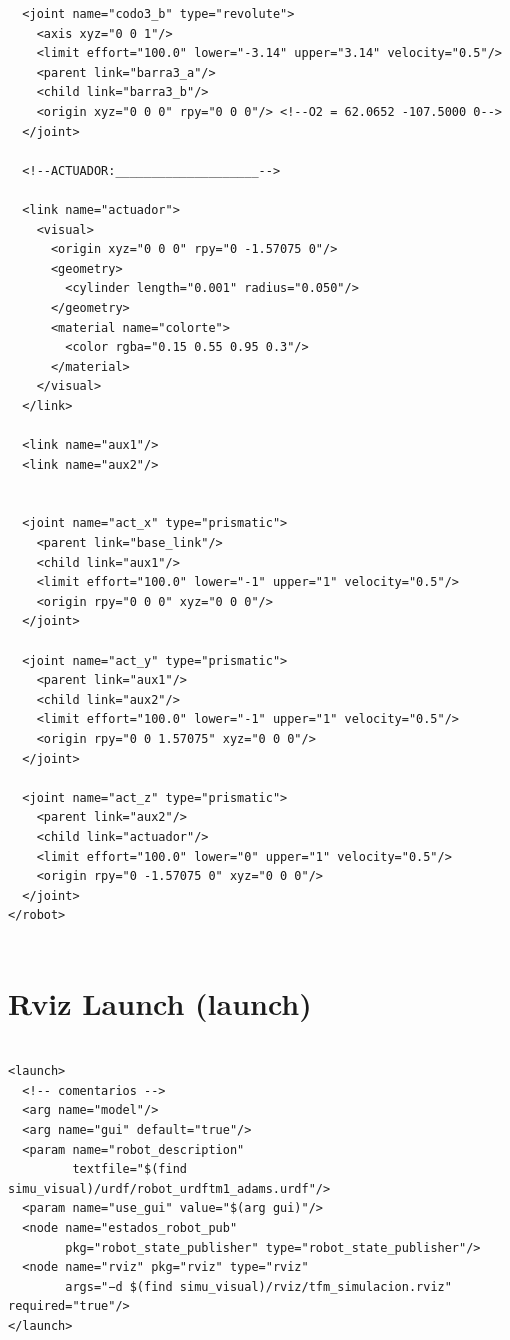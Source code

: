 \begin{lstlisting}
  <joint name="codo3_b" type="revolute">
    <axis xyz="0 0 1"/>
    <limit effort="100.0" lower="-3.14" upper="3.14" velocity="0.5"/>
    <parent link="barra3_a"/>
    <child link="barra3_b"/>
    <origin xyz="0 0 0" rpy="0 0 0"/> <!--O2 = 62.0652 -107.5000 0-->
  </joint>

  <!--ACTUADOR:____________________-->

  <link name="actuador">
    <visual>
      <origin xyz="0 0 0" rpy="0 -1.57075 0"/>
      <geometry>
        <cylinder length="0.001" radius="0.050"/>
      </geometry>
      <material name="colorte">
        <color rgba="0.15 0.55 0.95 0.3"/>
      </material>
    </visual>
  </link>

  <link name="aux1"/>
  <link name="aux2"/>


  <joint name="act_x" type="prismatic">
    <parent link="base_link"/>
    <child link="aux1"/>
    <limit effort="100.0" lower="-1" upper="1" velocity="0.5"/>
    <origin rpy="0 0 0" xyz="0 0 0"/>
  </joint>

  <joint name="act_y" type="prismatic">
    <parent link="aux1"/>
    <child link="aux2"/>
    <limit effort="100.0" lower="-1" upper="1" velocity="0.5"/>
    <origin rpy="0 0 1.57075" xyz="0 0 0"/>
  </joint>

  <joint name="act_z" type="prismatic">
    <parent link="aux2"/>
    <child link="actuador"/>
    <limit effort="100.0" lower="0" upper="1" velocity="0.5"/>
    <origin rpy="0 -1.57075 0" xyz="0 0 0"/>
  </joint>
</robot>


    \end{lstlisting}

    
    \newpage
    
    \section{Rviz Launch (launch)}
        \lstset{language=XML}

    \begin{lstlisting}

<launch>
  <!-- comentarios -->
  <arg name="model"/>
  <arg name="gui" default="true"/>
  <param name="robot_description" 
		 textfile="$(find simu_visual)/urdf/robot_urdftm1_adams.urdf"/>
  <param name="use_gui" value="$(arg gui)"/>
  <node name="estados_robot_pub" 
		pkg="robot_state_publisher" type="robot_state_publisher"/>
  <node name="rviz" pkg="rviz" type="rviz" 
		args="−d $(find simu_visual)/rviz/tfm_simulacion.rviz" required="true"/>
</launch>
    \end{lstlisting}

